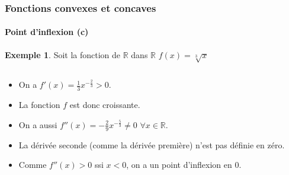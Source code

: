 \documentclass[10pt,notheorems]{beamer}
\theoremstyle{plain}
\theoremstyle{definition} %
\newtheorem{example}{Exemple}
\begin{document}
\begin{frame}
  \frametitle{Fonctions convexes et concaves}
  \framesubtitle{Point d'inflexion (c)}
  \hypertarget{slide_fonctions_convexes_13}{}

  \begin{example}
    Soit la fonction de $\mathbb R$ dans $\mathbb R$ $f(x) = \sqrt[3]{x}$

    \begin{columns}[onlytextwidth]
      \begin{column}{.5\textwidth}
        \begin{itemize}
        \item On a $f'(x) = \frac{1}{3}x^{-\frac{2}{3}}>0$.\newline
        \item La fonction $f$ est donc croissante.\newline
        \item On a aussi $f''(x) = -\frac{2}{9}x^{-\frac{5}{3}}\neq 0$ $\forall x\in\mathbb R$.\newline
        \item La dérivée seconde (comme la dérivée première) n'est pas définie en zéro.\newline
        \item Comme $f''(x)>0$ ssi $x<0$, on a un point d'inflexion en 0.
        \end{itemize}
      \end{column}
      \begin{column}{.5\textwidth}
        \begin{center}
        \end{center}
      \end{column}
    \end{columns}
  \end{example}

\end{frame}
\end{document}
